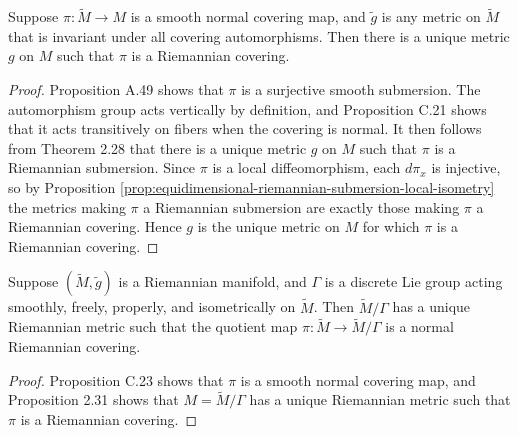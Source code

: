 \begin{proposition}
\label{prop:riemannian-covering-metric}
\leanok
{}

Suppose $\pi: \tilde{M} \to M$ is a smooth normal covering map, and $\tilde{g}$ is any metric on $\tilde{M}$ that is invariant under all covering automorphisms. Then there is a unique metric $g$ on $M$ such that $\pi$ is a Riemannian covering.
\end{proposition}

\begin{proof}
\leanok
Proposition A.49 shows that $\pi$ is a surjective smooth submersion. The automorphism group acts vertically by definition, and Proposition C.21 shows that it acts transitively on fibers when the covering is normal. It then follows from Theorem 2.28 that there is a unique metric $g$ on $M$ such that $\pi$ is a Riemannian submersion. Since $\pi$ is a local diffeomorphism, each $d\pi_x$ is injective, so by Proposition \ref{prop:equidimensional-riemannian-submersion-local-isometry} the metrics making $\pi$ a Riemannian submersion are exactly those making $\pi$ a Riemannian covering. Hence $g$ is the unique metric on $M$ for which $\pi$ is a Riemannian covering.
\end{proof}

\begin{proposition}
\label{prop:riemannian-quotient-metric}
Suppose $(\widetilde{M}, \tilde{g})$ is a Riemannian manifold, and $\Gamma$ is a discrete Lie group acting smoothly, freely, properly, and isometrically on $\widetilde{M}$. Then $\widetilde{M}/\Gamma$ has a unique Riemannian metric such that the quotient map $\pi: \widetilde{M} \to \widetilde{M}/\Gamma$ is a normal Riemannian covering.
\end{proposition}

\begin{proof}
Proposition C.23 shows that $\pi$ is a smooth normal covering map, and Proposition 2.31 shows that $M = \widetilde{M}/\Gamma$ has a unique Riemannian metric such that $\pi$ is a Riemannian covering.
\end{proof}

